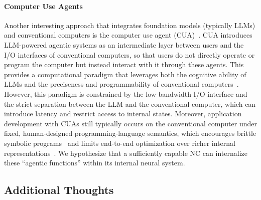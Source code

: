 \paragraph{Computer Use Agents}
Another interesting approach that integrates foundation models (typically LLMs) and conventional computers is the computer use agent (CUA)~\citep{openaiComputerUsingAgent,claudeComputerTool,sager2025comprehensivesurveyagentscomputer}. 
CUA introduces LLM-powered agentic systems as an intermediate layer between users and the I/O interfaces of conventional computers, so that users do not directly operate or program the computer but instead interact with it through these agents.
This provides a computational paradigm that leverages both the cognitive ability of LLMs and the preciseness and programmability of conventional computers~\citep{song2025coact1computerusingagentscoding}.
However, this paradigm is constrained by the low-bandwidth I/O interface and the strict separation between the LLM and the conventional computer, which can introduce latency and restrict access to internal states.
Moreover, application development with CUAs still typically occurs on the conventional computer under fixed, human-designed programming-language semantics, which encourages brittle symbolic programs~\citep{liang-etal-2017-neural} and limits end-to-end optimization over richer internal representations~\citep{hu2017learningreasonendtoendmodule,gaunt2016terpretprobabilisticprogramminglanguage}.
We hypothesize that a sufficiently capable NC can internalize these ``agentic functions'' within its internal neural system.

\subsection{Additional Thoughts} %






